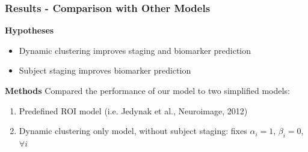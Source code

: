 \documentclass[8pt,xcolor=table]{beamer}
\begin{document}
\begin{frame}
\frametitle{Results - Comparison with Other Models}


\textbf{Hypotheses}
\begin{itemize}
 \item Dynamic clustering improves staging and biomarker prediction
 \item Subject staging improves biomarker prediction
\end{itemize}

\vfill

\textbf{Methods}
Compared the performance of our model to two simplified models:
 \begin{enumerate}
  \item Predefined ROI model (i.e. Jedynak et al., Neuroimage, 2012)
  \item Dynamic clustering only model, without subject staging: fixes $\alpha_i=1$, $\beta_i=0$, $\forall i$
 \end{enumerate}

\vfill
 

\end{frame}
\end{document}
